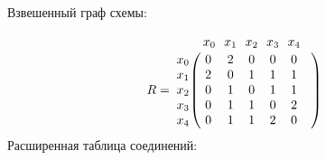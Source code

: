 \documentclass{article}
\begin{document}
Взвешенный граф схемы:
\begin{figure}[h!]
\end{figure}
$$
R =
\bordermatrix{ & x_{0} \!&\! x_{1} \!&\! x_{2} \!&\! x_{3} \!&\! x_{4} \!&\! \cr 
x_{0} \!&\! 0 \!&\! 2 \!&\! 0 \!&\! 0 \!&\! 0 \!&\! \cr
x_{1} \!&\! 2 \!&\! 0 \!&\! 1 \!&\! 1 \!&\! 1 \!&\! \cr
x_{2} \!&\! 0 \!&\! 1 \!&\! 0 \!&\! 1 \!&\! 1 \!&\! \cr
x_{3} \!&\! 0 \!&\! 1 \!&\! 1 \!&\! 0 \!&\! 2 \!&\! \cr
x_{4} \!&\! 0 \!&\! 1 \!&\! 1 \!&\! 2 \!&\! 0 \!&\! \cr
}$$
Расширенная таблица соединений:
\end{document}
